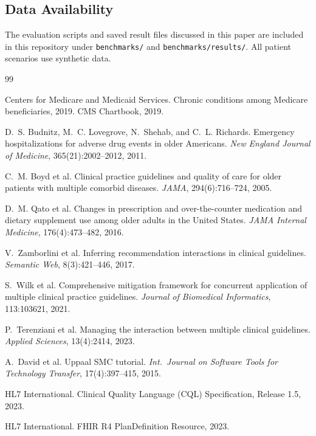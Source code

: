 \documentclass{article}
\theoremstyle{definition}
\begin{document}
\subsection*{Data Availability}
The evaluation scripts and saved result files discussed in this paper are included in this repository under \texttt{benchmarks/} and \texttt{benchmarks/results/}. All patient scenarios use synthetic data.

\begin{thebibliography}{99}

Centers for Medicare and Medicaid Services.
Chronic conditions among Medicare beneficiaries, 2019.
CMS Chartbook, 2019.

D.~S. Budnitz, M.~C. Lovegrove, N.~Shehab, and C.~L. Richards.
Emergency hospitalizations for adverse drug events in older Americans.
\emph{New England Journal of Medicine}, 365(21):2002--2012, 2011.

C.~M. Boyd et al.
Clinical practice guidelines and quality of care for older patients with multiple comorbid diseases.
\emph{JAMA}, 294(6):716--724, 2005.

D.~M. Qato et al.
Changes in prescription and over-the-counter medication and dietary supplement use among older adults in the United States.
\emph{JAMA Internal Medicine}, 176(4):473--482, 2016.

V.~Zamborlini et al.
Inferring recommendation interactions in clinical guidelines.
\emph{Semantic Web}, 8(3):421--446, 2017.

S.~Wilk et al.
Comprehensive mitigation framework for concurrent application of multiple clinical practice guidelines.
\emph{Journal of Biomedical Informatics}, 113:103621, 2021.

P.~Terenziani et al.
Managing the interaction between multiple clinical guidelines.
\emph{Applied Sciences}, 13(4):2414, 2023.

A.~David et al.
Uppaal SMC tutorial.
\emph{Int.\ Journal on Software Tools for Technology Transfer}, 17(4):397--415, 2015.

HL7 International.
Clinical Quality Language (CQL) Specification, Release 1.5, 2023.

HL7 International.
FHIR R4 PlanDefinition Resource, 2023.


\end{thebibliography}
\end{document}
